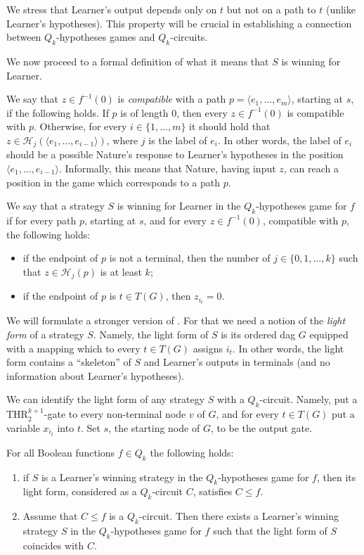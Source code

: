 \documentclass{toc}
\def\THR{\mathrm{THR}}
\begin{document}
We stress that Learner's output depends only on $t$ but not on a path to $t$ (unlike Learner's hypotheses). This property will be crucial in establishing a connection between $Q_k$-hypotheses games and $Q_k$-circuits.

We now proceed to a formal definition of what it means that $S$ is winning for Learner.

We say that $z\in f^{-1}(0)$ is \emph{compatible} with a path $p = \langle e_1, \ldots, e_m\rangle$, starting at $s$, if the following holds. If $p$ is of length $0$, then every $z\in f^{-1}(0)$ is compatible with $p$. Otherwise, for every $i\in\{1, \ldots, m\}$ it should hold that $z\in\mathcal{H}_j(\langle e_1, \ldots, e_{i - 1}\rangle)$, where $j$ is the label of $e_i$. In other words, the label of $e_i$ should be a possible Nature's response to Learner's hypotheses in the position $\langle e_1, \ldots, e_{i - 1}\rangle$.
Informally, this means that Nature, having input $z$, can reach a position in the game which corresponds to a path $p$.

We say that a strategy $S$ is winning for Learner in the $Q_k$-hypotheses game for $f$ if for every path $p$, starting at $s$, and for every $z\in f^{-1}(0)$, compatible with $p$, the following holds:
\begin{itemize}
\item if the endpoint of $p$ is not a terminal, then the number of $j\in\{0, 1, \ldots, k\}$ such that $z\in \mathcal{H}_j(p)$ is at least $k$;
\item if the endpoint of $p$ is $t\in T(G)$, then $z_{i_t} = 0$.
\end{itemize}
We will formulate a stronger version of . For that we need a notion of the \emph{light form} of a strategy $S$. Namely, the light form of $S$ is its ordered dag $G$ equipped with a mapping which to every $t\in T(G)$ assigns $i_t$. In other words, the light form contains a ``skeleton'' of $S$ and Learner's outputs in terminals (and no information about Learner's hypotheses). 

We can identify the light form of any strategy $S$ with a $Q_k$-circuit. Namely, put a $\THR^{k + 1}_2$-gate to every non-terminal node $v$ of $G$, and for every $t\in T(G)$ put a variable $x_{i_t}$ into $t$.
Set $s$, the starting node of $G$, to be %
the output gate. 

\begin{proposition}
\label{Q_k_equivalence}
For all Boolean functions $f\in Q_k$ the following holds:
\begin{enumerate}[label=(\alph*)]
\item if $S$ is a Learner's winning strategy in the $Q_k$-hypotheses game for $f$, then its light form, considered as a $Q_k$-circuit $C$, satisfies $C\le f$.


\item  Assume that $C\le f$ is a $Q_k$-circuit. Then there exists a Learner's winning strategy $S$ in the $Q_k$-hypotheses game for $f$ such that the light form of $S$ coincides with $C$.
\end{enumerate}
\end{proposition} 
\end{document}
